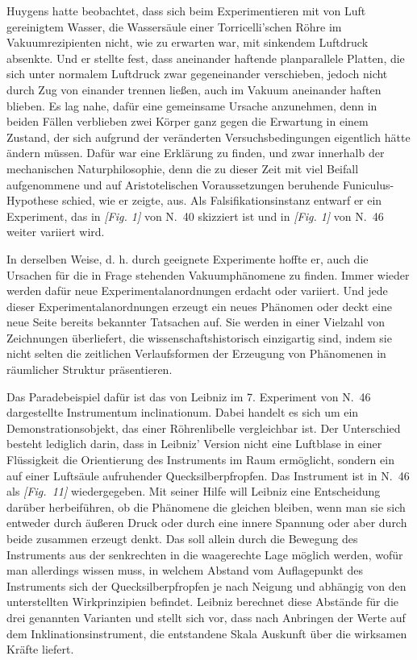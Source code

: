 Huygens hatte beobachtet, dass sich beim Experimentieren mit von Luft gereinigtem Wasser, die Wassers\"{a}ule einer Torricelli'schen R\"{o}hre im Vakuumrezipienten nicht, wie zu erwarten war, mit sinkendem Luftdruck absenkte. Und er stellte fest, dass aneinander haftende planparallele Platten, die sich unter normalem Luftdruck zwar gegeneinander verschieben, jedoch nicht durch Zug von einander trennen lie{\ss}en, auch im Vakuum aneinander haften blieben. Es lag nahe, daf\"{u}r eine gemeinsame Ursache anzunehmen, denn in beiden F\"{a}llen verblieben zwei K\"{o}rper ganz gegen die Erwartung in einem Zustand, der sich aufgrund der ver\"{a}nderten Versuchsbedingungen eigentlich h\"{a}tte \"{a}ndern m\"{u}ssen. Daf\"{u}r war eine Erkl\"{a}rung zu finden, und zwar innerhalb der mechanischen Naturphilosophie, denn die zu dieser Zeit mit viel Beifall aufgenommene und auf Aristotelischen Voraussetzungen beruhende Funiculus-Hypothese schied, wie er zeigte, aus. Als Falsifikationsinstanz entwarf er ein Experiment, das in \textit{[Fig. 1]} von N.~40 skizziert ist und in \textit{[Fig. 1]} von N.~46 weiter variiert wird.\par
In derselben Weise, d. h. durch geeignete Experimente hoffte er, auch die Ursachen f\"{u}r die in Frage stehenden Vakuumph\"{a}nomene zu finden. Immer wieder werden daf\"{u}r neue Experimentalanordnungen erdacht oder variiert. Und jede dieser Experimentalanordnungen erzeugt ein neues Ph\"{a}nomen oder deckt eine neue Seite bereits bekannter Tatsachen auf. Sie werden in einer Vielzahl von Zeichnungen \"{u}berliefert, die wissenschaftshistorisch einzigartig sind, indem sie nicht selten die zeitlichen Verlaufsformen der Erzeugung von Ph\"{a}nomenen in r\"{a}umlicher Struktur pr\"{a}sentieren.\par
Das Paradebeispiel daf\"{u}r ist das von Leibniz im 7. Experiment von N.~46 dargestellte Instrumentum inclinationum. Dabei handelt es sich um ein Demonstrationsobjekt, das einer R\"{o}hrenlibelle vergleichbar ist. Der Unterschied besteht lediglich darin, dass in Leibniz' Version nicht eine Luftblase in einer Fl\"{u}ssigkeit die Orientierung des Instruments im Raum erm\"{o}glicht, sondern ein auf einer Luft\-s\"{a}ule aufruhender Quecksilberpfropfen. Das Instrument ist in N.~46 als \textit{[Fig.~11]} wiedergegeben. Mit seiner Hilfe will Leibniz eine Entscheidung dar\"{u}ber herbeif\"{u}hren, ob die Ph\"{a}nomene die gleichen bleiben, wenn man sie sich entweder durch \"{a}u{\ss}eren Druck oder durch eine innere Spannung oder aber durch beide zusammen erzeugt denkt. Das soll allein durch die Bewegung des Instruments aus der senkrechten in die waagerechte Lage m\"{o}glich werden, wof\"{u}r man allerdings wissen muss, in welchem Abstand vom Auflagepunkt des Instruments sich der Quecksilberpfropfen je nach Neigung und abh\"{a}ngig von den unterstellten Wirk\-prinzipien befindet. Leibniz berechnet diese Abst\"{a}nde f\"{u}r die drei genannten Varianten und stellt sich vor, dass nach Anbringen der Werte auf dem In\-klinationsinstrument, die entstandene Skala Auskunft \"{u}ber die wirksamen Kr\"{a}fte liefert.\par
